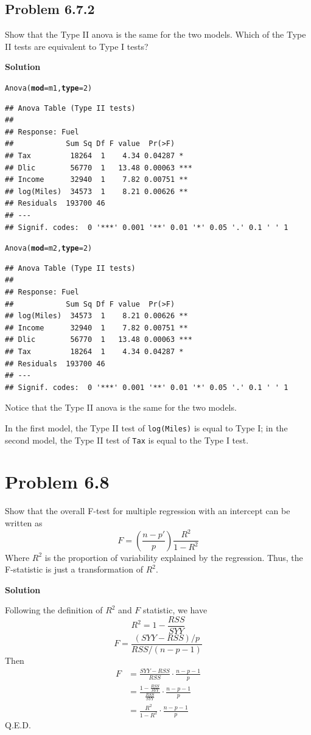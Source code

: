 \documentclass[12pt,oneside,a4paper]{article}\usepackage[]{graphicx}\usepackage[]{xcolor}
\makeatletter
\newcommand{\hlnum}[1]{\textcolor[rgb]{0,0,0}{#1}}%
\newcommand{\hlstd}[1]{\textcolor[rgb]{0,0,0}{#1}}%
\newcommand{\hlkwc}[1]{\textcolor[rgb]{0.498,0,0.333}{\textbf{#1}}}%
\newcommand{\hlkwd}[1]{\textcolor[rgb]{0,0,0}{#1}}%
\newenvironment{kframe}{%
 \def\at@end@of@kframe{}%
 \ifinner\ifhmode%
  \def\at@end@of@kframe{\end{minipage}}%
  \begin{minipage}{\columnwidth}%
 \fi\fi%
 \def\FrameCommand##1{\hskip\@totalleftmargin \hskip-\fboxsep
 \colorbox{shadecolor}{##1}\hskip-\fboxsep
     \hskip-\linewidth \hskip-\@totalleftmargin \hskip\columnwidth}%
 \MakeFramed {\advance\hsize-\width
   \@totalleftmargin\z@ \linewidth\hsize
   \@setminipage}}%
 {\par\unskip\endMakeFramed%
 \at@end@of@kframe}
\newenvironment{knitrout}{}{} %
\newcommand{\problem}[1]
{
    \clearpage
    \section*{Problem {#1}}
}
\newcommand{\subproblem}[1]
{
    \subsection*{Problem {#1}}
}
\newcommand{\solution}
{
    \vspace{15pt}
    \noindent\ignorespaces\textbf{\large Solution}
}
\newcommand{\m}[1]{\texttt{{#1}}}
\makeatother
\begin{document}
\subproblem{6.7.2}
Show that the Type II anova is the same for the two models. Which of the Type II tests are equivalent to Type I tests?

\solution
\begin{knitrout}
\color{fgcolor}\begin{kframe}
\begin{alltt}
\hlkwd{Anova}\hlstd{(}\hlkwc{mod} \hlstd{= m1,} \hlkwc{type} \hlstd{=} \hlnum{2}\hlstd{)}
\end{alltt}
\begin{verbatim}
## Anova Table (Type II tests)
## 
## Response: Fuel
##            Sum Sq Df F value  Pr(>F)    
## Tax         18264  1    4.34 0.04287 *  
## Dlic        56770  1   13.48 0.00063 ***
## Income      32940  1    7.82 0.00751 ** 
## log(Miles)  34573  1    8.21 0.00626 ** 
## Residuals  193700 46                    
## ---
## Signif. codes:  0 '***' 0.001 '**' 0.01 '*' 0.05 '.' 0.1 ' ' 1
\end{verbatim}
\begin{alltt}
\hlkwd{Anova}\hlstd{(}\hlkwc{mod} \hlstd{= m2,} \hlkwc{type} \hlstd{=} \hlnum{2}\hlstd{)}
\end{alltt}
\begin{verbatim}
## Anova Table (Type II tests)
## 
## Response: Fuel
##            Sum Sq Df F value  Pr(>F)    
## log(Miles)  34573  1    8.21 0.00626 ** 
## Income      32940  1    7.82 0.00751 ** 
## Dlic        56770  1   13.48 0.00063 ***
## Tax         18264  1    4.34 0.04287 *  
## Residuals  193700 46                    
## ---
## Signif. codes:  0 '***' 0.001 '**' 0.01 '*' 0.05 '.' 0.1 ' ' 1
\end{verbatim}
\end{kframe}
\end{knitrout}

Notice that the Type II anova is the same for the two models.

In the first model, the Type II test of \m{log(Miles)} is equal to Type I; in the second model, the Type II test of \m{Tax} is equal to the Type I test.

\problem{6.8}
Show that the overall F-test for multiple regression with an intercept can be written as
$$F = (\frac{n - p'}{p})\frac{R^{2}}{1-R^{2}}$$
Where $R^{2}$ is the proportion of variability explained by the regression. Thus, the F-statistic is just a transformation of $R^{2}$.

\solution

Following the definition of $R^{2}$ and $F$ statistic, we have
$$R^{2} = 1 - \frac{RSS}{SYY}$$
$$F = \frac{(SYY-RSS)/p}{RSS/(n - p - 1)}$$
Then 
$$\begin{aligned}
F & =\frac{SYY - RSS}{RSS} \cdot \frac{n - p - 1}{p}\\
& = \frac{1 - \frac{RSS}{SYY}}{\frac{RSS}{SYY}} \cdot \frac{n - p - 1}{p}\\
& = \frac{R^{2}}{1 - R^{2}} \cdot \frac{n - p - 1}{p}
\end{aligned}$$
Q.E.D.
\end{document}
